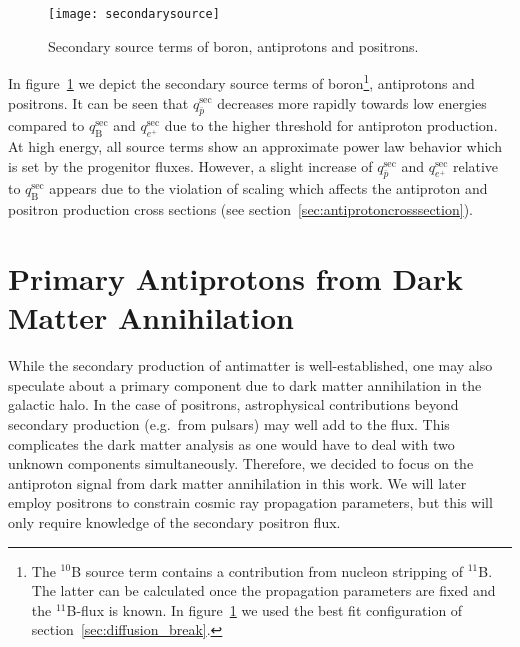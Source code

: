 \documentclass[a4paper,11pt]{article}
\begin{document}
\begin{figure}[htp]
\begin{center}
  \texttt{[image: secondarysource]}
\end{center}
\caption{Secondary source terms of boron, antiprotons and positrons.}
\label{fig:secondarysource}
\end{figure}

In figure~\ref{fig:secondarysource} we depict the secondary source terms of boron\footnote{The $^{10}$B source term contains a contribution from nucleon stripping of $^{11}$B. The latter can be calculated once the propagation parameters are fixed and the $^{11}$B-flux is known. In figure~\ref{fig:secondarysource} we used the best fit configuration of section~\ref{sec:diffusion_break}.}, antiprotons and positrons. It can be seen that $q_{\bar{p}}^{\text{sec}}$ decreases more rapidly towards low energies compared to $q_{\text{B}}^{\text{sec}}$ and $q_{e^+}^{\text{sec}}$ due to the higher threshold for antiproton production. At high energy, all source terms show an approximate power law behavior which is set by the progenitor fluxes. However, a slight increase of $q_{\bar{p}}^{\text{sec}}$ and $q_{e^+}^{\text{sec}}$ relative to $q_{\text{B}}^{\text{sec}}$ appears due to the violation of scaling which affects the antiproton and positron production cross sections (see section~\ref{sec:antiprotoncrosssection}).


\section{Primary Antiprotons from Dark Matter Annihilation}\label{sec:darkmatterpbar}

While the secondary production of antimatter is well-established, one may also speculate about a primary component due to dark matter annihilation in the galactic halo. In the case of positrons, astrophysical contributions beyond secondary production (e.g.\ from pulsars) may well add to the flux. This complicates the dark matter analysis as one would have to deal with two unknown components simultaneously. Therefore, we decided to focus on the antiproton signal from dark matter annihilation in this work. We will later employ positrons to constrain cosmic ray propagation parameters, but this will only require knowledge of the secondary positron flux.
\end{document}
